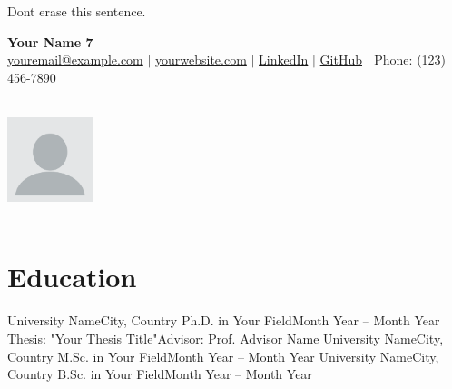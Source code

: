 \label{ResumeSeven} %
\thesisspacing %


{\color{white}Dont erase this sentence.}
\medskip



\begin{minipage}{0.7\textwidth}
    \textbf{\Huge Your Name 7} \\[5pt]
    \small \href{mailto:youremail@example.com}{youremail@example.com} $|$ 
    \href{https://yourwebsite.com}{yourwebsite.com} $|$ 
    \href{https://linkedin.com/in/yourprofile}{LinkedIn} $|$ 
    \href{https://github.com/yourprofile}{GitHub} $|$ 
    Phone: (123) 456-7890
\end{minipage}
\begin{minipage}{0.3\textwidth}
    \begin{flushright}
        \includegraphics[width=2.5cm, height=3.5cm]{imgs/your_photo.png} %
    \end{flushright}
\end{minipage}

\section*{Education}
\begin{itemize}[leftmargin=*]
    \resumeEntry
        {University Name}{City, Country}
        {Ph.D. in Your Field}{Month Year – Month Year}
    \resumeSubentry
        {Thesis: "Your Thesis Title"}{Advisor: Prof. Advisor Name}
    \resumeEntry
        {University Name}{City, Country}
        {M.Sc. in Your Field}{Month Year – Month Year}
    \resumeEntry
        {University Name}{City, Country}
        {B.Sc. in Your Field}{Month Year – Month Year}
\end{itemize}

